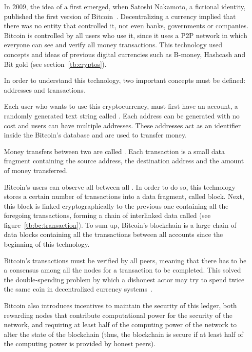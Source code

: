 In 2009, the idea of a  first emerged, when
Satoshi Nakamoto, a fictional identity, published the first version of
Bitcoin~\cite{nakamoto2008bitcoin}. Decentralizing a currency implied that there
was no entity that controlled it, not even banks, governments or companies.
Bitcoin is controlled by all users who use it, since it uses a P2P network in
which everyone can see and verify all money transactions. This technology used
concepts and ideas of previous digital currencies such as B-money, Hashcash and
Bit gold (see section~\ref{tb:cryptos}).

In order to understand this technology, two important concepts must be defined:
addresses and transactions.

Each user who wants to use this cryptocurrency, must first have an account, a
randomly generated text string called . Each address can be
generated with no cost and users can have multiple addresses. These addresses
act as an identifier inside the Bitcoin's database and are used to transfer
money.

Money transfers between two  are called . Each
transaction is a small data fragment containing the source address, the
destination address and the amount of money transferred.

Bitcoin's users can observe all  between all . In
order to do so, this technology stores a certain number of transactions into a
data fragment, called block. Next, this block is linked cryptographically to the
previous one containing all the foregoing transactions, forming a chain of
interlinked data called  (see figure~\ref{tb:bc:transaction}). To
sum up, Bitcoin's blockchain is a large chain of data blocks containing all the
transactions between all accounts since the beginning of this technology.

Bitcoin's transactions must be verified by all peers, meaning that there has to
be a consensus among all the nodes for a transaction to be completed. This
solved the double-spending problem by which a dishonest actor may try to spend
twice the same coin in decentralized currency systems~\cite{chohan2017double}.

Bitcoin also introduces incentives to maintain the security of this ledger, both
rewarding nodes that contribute computational power for the security of the
network, and requiring at least half of the computing power of the network to
alter the state of the blockchain (thus, the blockchain is secure if at least
half of the computing power is provided by honest peers).


